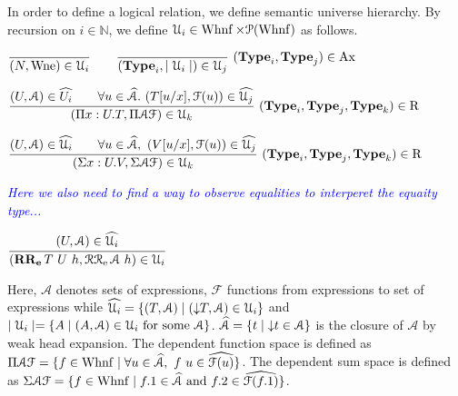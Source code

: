 \documentclass[a4paper,english]{lipics-utf8x}
\newcommand\meta[1]{\noindent\textcolor{blue}{\emph{#1}}}
\begin{document}

  In order to define a logical relation, we define semantic universe hierarchy.
  By recursion on $i \in \mathbb{N}$, we define
  $\mathcal{U}_i \in \operatorname{Whnf} \times \mathcal{P}(\operatorname{Whnf})$ as follows.

  \begin{center}
  \(
    \ru{}{(N, \Wne) \in \U_i}
    \qquad
    \rux{}{(\Type_i, \mid \U_i \mid) \in \U_j}{(\Type_i,\Type_j) \in \Ax}
  \)
  \end{center}

  \begin{center}
  \(
    \rux{(U, \mathcal{A}) \in \widehat{U_i} \qquad
         \forall u \in \widehat{\mathcal{A}}.\ (T[u/x],\mathcal{F}(u)) \in
         \widehat{\U_j}
       }{(\Pi x:U.T, \Pi \mathcal{A} \mathcal{F}) \in \U_k
       }{(\Type_i, \Type_j, \Type_k) \in \R}
  \)
  \end{center}

  \begin{center}
  \(
    \rux{(U, \mathcal{A}) \in \widehat{\U_i} \qquad
        \forall u \in \widehat{\mathcal{A}},\ (V[u/x], \mathcal{F}(u)) \in
        \widehat{\U_j}
       }{(\Sigma x:U.V, \Sigma \mathcal{A} \mathcal{F}) \in \U_k
       }{(\Type_i, \Type_j, \Type_k) \in \R}
  \)
  \end{center}

  \meta{Here we also need to find a way to observe equalities to interperet
  the equaity type...}

  \begin{center}
  \(
    \ru{(U, \mathcal{A}) \in \widehat{\U_i}
      }{(\RRe{T}{U}{h}, \RRcal{\mathcal{A}}{h}) \in \U_i}
  \)
  \end{center}

  \noindent %
  Here, $\mathcal{A}$ denotes sets of expressions, $\mathcal{F}$ functions from
  expressions to set of expressions while
  $\widehat{\mathcal{U}_i} = \{ (T,\mathcal{A}) \mid ({\downarrow} T, \mathcal{A}) \in \mathcal{U}_i \}$
  and $\mid \mathcal{U}_i \mid = \{ A \mid (A, \mathcal{A}) \in \mathcal{U}_i \text{ for some }
  \mathcal{A} \}$.
  $\widehat{\mathcal{A}} = \{ t \mid {\downarrow} t \in \mathcal{A} \}$ is the closure
  of $\mathcal{A}$ by weak head expansion.
  The dependent function space is defined as
  $\Pi \mathcal{A} \mathcal{F} = \{ f \in \operatorname{Whnf} \mid \forall u \in
  \widehat{\mathcal{A}},\ f~u \in \widehat{\mathcal{F}(u)} \}$.
  The dependent sum space is defined as
  $\Sigma \mathcal{A} \mathcal{F} = \{ f \in \operatorname{Whnf} \mid f.1 \in
  \widehat{\mathcal{A}} \text{ and } f.2 \in \widehat{\mathcal{F}(f.1)} \}$.
\end{document}
